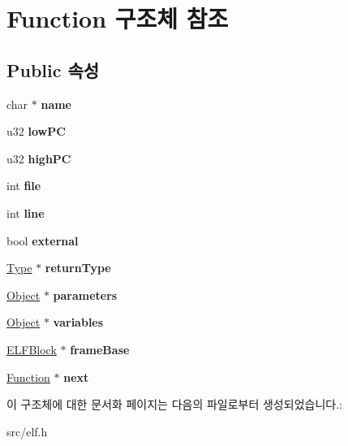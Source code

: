\hypertarget{struct_function}{}\section{Function 구조체 참조}
\label{struct_function}
\subsection*{Public 속성}
\begin{DoxyCompactItemize}
\item 
\mbox{\label{struct_function_afc3b67aebc6b6c91044c6b09d7279eb0}} 
char $\ast$ {\bfseries name}
\item 
\mbox{\label{struct_function_acfcfc3e0b585bafa5690e3edf8936d87}} 
u32 {\bfseries low\+PC}
\item 
\mbox{\label{struct_function_ac2bb5cba39265122d94851eba25eb5d6}} 
u32 {\bfseries high\+PC}
\item 
\mbox{\label{struct_function_a09b77b9d9601b328d7127c62ed93d850}} 
int {\bfseries file}
\item 
\mbox{\label{struct_function_a5b0b91c925b133e7eb1f0cae96f7aecc}} 
int {\bfseries line}
\item 
\mbox{\label{struct_function_ad775b69acac9b0efaea721d30d48afe5}} 
bool {\bfseries external}
\item 
\mbox{\label{struct_function_ac0e42dfc7467e114a2a55005bd5549e2}} 
\mbox{\hyperlink{struct_type}{Type}} $\ast$ {\bfseries return\+Type}
\item 
\mbox{\label{struct_function_a54c66e528d60629f16233e5690e46863}} 
\mbox{\hyperlink{struct_object}{Object}} $\ast$ {\bfseries parameters}
\item 
\mbox{\label{struct_function_af68017d9a2b267a45154499c26ee981d}} 
\mbox{\hyperlink{struct_object}{Object}} $\ast$ {\bfseries variables}
\item 
\mbox{\label{struct_function_af5d7f2b7322272714f24ca36b2199c12}} 
\mbox{\hyperlink{struct_e_l_f_block}{E\+L\+F\+Block}} $\ast$ {\bfseries frame\+Base}
\item 
\mbox{\label{struct_function_a20ace60d6eba6736e143166b0137b87f}} 
\mbox{\hyperlink{struct_function}{Function}} $\ast$ {\bfseries next}
\end{DoxyCompactItemize}


이 구조체에 대한 문서화 페이지는 다음의 파일로부터 생성되었습니다.\+:\begin{DoxyCompactItemize}
\item 
src/elf.\+h\end{DoxyCompactItemize}
